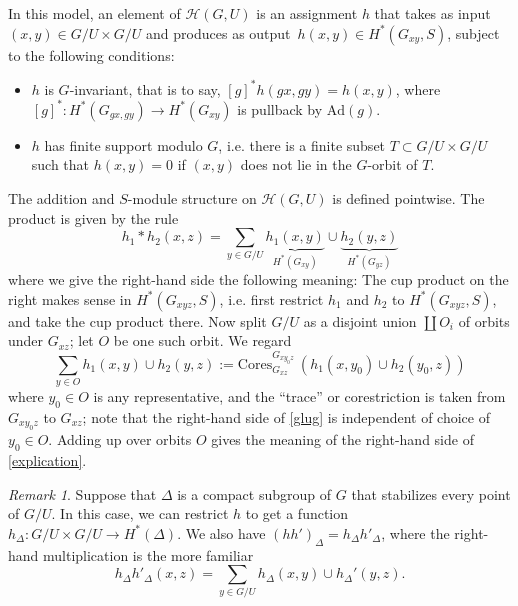 \documentclass[10pt]{amsart}
\newcommand{\Ad}{\mathrm{Ad}}
\theoremstyle{remark}
\newtheorem*{remark}{Remark}
\begin{document}
 
 

In this model, an element of $\mathscr{H}(G, U)$ 
is an assignment $h$ that takes  as input $(x,y) \in G/U \times G/U$
and produces as output\  $h(x,y) \in H^*(G_{xy}, S)$, subject to the following conditions:
\begin{itemize}
\item $h$ is $G$-invariant, that is to say, $[g]^* h(gx, gy) =   h(x,y)$,
where $[g]^*: H^*(G_{gx,gy}) \rightarrow H^*(G_{xy})$ is pullback by $\Ad(g)$. 
 \item  $h$ has finite support modulo $G$, i.e. there is a finite subset $T \subset G/U \times G/U$  such that $h(x,y)  = 0$ if $(x,y) $ does not lie in the $G$-orbit of $T$. 
\end{itemize}


The addition and $S$-module structure on $\mathscr{H}(G, U)$ is defined pointwise. 
The product is given by the rule 
 \begin{equation} \label{explication} h_1 * h_2(x,z) = \sum_{y \in G/U} \underbrace{h_1(x,y) }_{H^*(G_{xy})} \cup \underbrace{h_2(y,z)}_{H^*(G_{yz})} \end{equation} 
 where we give the right-hand side the following meaning: 
  The cup product  on the right makes sense in $H^*(G_{xyz},S)$, i.e. first restrict $h_1$ and $h_2$ to $H^*(G_{xyz},S)$, 
  and take the cup product there. 
  Now split $G/U$ as a disjoint union $\coprod O_i$ of orbits under $G_{xz}$; let $O$ be one such orbit. 
 We regard 
\begin{equation} \label{glug} \sum_{y \in O}  h_1(x,y)  \cup h_2(y,z)  := \mathrm{Cores}^{G_{x y_0 z}}_{G_{xz}} \ \left( h_1(x, y_0) \cup  h_2(y_0, z) \right)\end{equation}
 where $y_0 \in O$ is any representative, and the ``trace'' or corestriction is taken
 from $G_{x y_0 z} $ to $G_{xz}$; note that the right-hand side of  \eqref{glug} is independent of choice of $y_0 \in O$. 
 Adding up over orbits $O$ gives the meaning of the right-hand side of \eqref{explication}. 
  
  
  \begin{remark} 
  Suppose that $\Delta$ is a compact subgroup of $G$ that stabilizes every point of $G/U$. 
  In this case, we can restrict $h$ to get a function $h_{\Delta}: G/U \times G/U \rightarrow H^*(\Delta)$.
  We also have $(h h')_{\Delta}=  h_{\Delta} h'_{\Delta}$, where the right-hand multiplication
is the more familiar
\begin{equation} \label{easier for me} h_{\Delta} h'_{\Delta}(x,z) = \sum_{y \in G/U} h_{\Delta}(x,y) \cup h_{\Delta}'(y,z).\end{equation}
  \end{remark}
\end{document}
